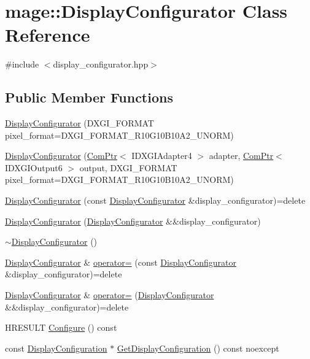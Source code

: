\hypertarget{classmage_1_1_display_configurator}{}\section{mage\+:\+:Display\+Configurator Class Reference}
\label{classmage_1_1_display_configurator}


{\ttfamily \#include $<$display\+\_\+configurator.\+hpp$>$}

\subsection*{Public Member Functions}
\begin{DoxyCompactItemize}
\item 
\hyperlink{classmage_1_1_display_configurator_a88fe13ec0a6902fdc1666a2710a16647}{Display\+Configurator} (D\+X\+G\+I\+\_\+\+F\+O\+R\+M\+AT pixel\+\_\+format=D\+X\+G\+I\+\_\+\+F\+O\+R\+M\+A\+T\+\_\+\+R10\+G10\+B10\+A2\+\_\+\+U\+N\+O\+RM)
\item 
\hyperlink{classmage_1_1_display_configurator_a2080c8163974aaa9a16f84e65126b355}{Display\+Configurator} (\hyperlink{namespacemage_ae74f374780900893caa5555d1031fd79}{Com\+Ptr}$<$ I\+D\+X\+G\+I\+Adapter4 $>$ adapter, \hyperlink{namespacemage_ae74f374780900893caa5555d1031fd79}{Com\+Ptr}$<$ I\+D\+X\+G\+I\+Output6 $>$ output, D\+X\+G\+I\+\_\+\+F\+O\+R\+M\+AT pixel\+\_\+format=D\+X\+G\+I\+\_\+\+F\+O\+R\+M\+A\+T\+\_\+\+R10\+G10\+B10\+A2\+\_\+\+U\+N\+O\+RM)
\item 
\hyperlink{classmage_1_1_display_configurator_a20d8fa60a9d511a114e603dddf1a3716}{Display\+Configurator} (const \hyperlink{classmage_1_1_display_configurator}{Display\+Configurator} \&display\+\_\+configurator)=delete
\item 
\hyperlink{classmage_1_1_display_configurator_aacf6436e2b16f883684826fe0ad0abdd}{Display\+Configurator} (\hyperlink{classmage_1_1_display_configurator}{Display\+Configurator} \&\&display\+\_\+configurator)
\item 
\hyperlink{classmage_1_1_display_configurator_af6546383269503e3cab077e4bf54556e}{$\sim$\+Display\+Configurator} ()
\item 
\hyperlink{classmage_1_1_display_configurator}{Display\+Configurator} \& \hyperlink{classmage_1_1_display_configurator_adf24194f83a0971a1c3076c1a23d1699}{operator=} (const \hyperlink{classmage_1_1_display_configurator}{Display\+Configurator} \&display\+\_\+configurator)=delete
\item 
\hyperlink{classmage_1_1_display_configurator}{Display\+Configurator} \& \hyperlink{classmage_1_1_display_configurator_a9d98a955cdbaf3bfe8913a4b561ad08d}{operator=} (\hyperlink{classmage_1_1_display_configurator}{Display\+Configurator} \&\&display\+\_\+configurator)=delete
\item 
H\+R\+E\+S\+U\+LT \hyperlink{classmage_1_1_display_configurator_aa84373fba5d7806f065f7633a03f7d64}{Configure} () const
\item 
const \hyperlink{structmage_1_1_display_configuration}{Display\+Configuration} $\ast$ \hyperlink{classmage_1_1_display_configurator_a9371158cf1e2686f43ece9e1a53ee3b6}{Get\+Display\+Configuration} () const noexcept
\end{DoxyCompactItemize}
